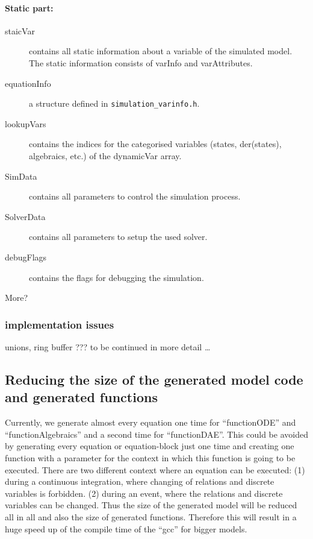 \paragraph{Static part:}
\begin{description}
\item[staicVar] contains all static information about a variable of the
simulated model. The static information consists of varInfo and varAttributes.
\item[equationInfo] a structure defined in \verb+simulation_varinfo.h+.
\item[lookupVars] contains the indices for the categorised variables (states,
der(states), algebraics, etc.) of the dynamicVar array.
\item[SimData] contains all parameters to control the simulation process.
\item[SolverData] contains all parameters to setup the used solver.
\item[debugFlags] contains the flags for debugging the simulation.
\item[More?]
\end{description}

\subsubsection{implementation issues}

unions, ring buffer ???
to be continued in more detail \ldots


\subsection{Reducing the size of the generated model code and generated
functions}\label{sec:ReduceSize}

Currently, we generate almost every equation one time for ``functionODE'' and
``functionAlgebraics'' and a second time for ``functionDAE''. This could be
avoided by generating every equation or equation-block just one time and
creating one function with a parameter for the context in which this function
is going to be executed. There are two different context where an equation
can be executed: (1) during a continuous integration, where changing of
relations and discrete variables is forbidden. (2) during an event, where the
relations and discrete variables can be changed.
Thus the size of the generated model will be reduced all in all and also the
size of generated functions. Therefore this will result in a huge speed
up of the compile time of the ``gcc'' for bigger models.

